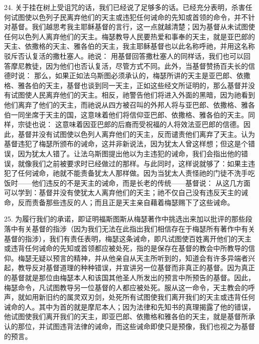 24. 关于挂在树上受诅咒的话，我们已经说了足够多的话。已经充分表明，杀害任何试图使以色列子民离弃他们的天主或违犯任何诫命的先知或首领的命令，并不针对基督。我们越思考我主耶稣基督的言行，这一点就越清楚；因为基督从未试图使任何以色列人离弃他们的天主。梅瑟教导人民要热爱和事奉的天主，就是亚巴郎的天主、依撒格的天主、雅各伯的天主，我主耶稣基督也以此名称呼祂，并用这名称驳斥否认复活的撒杜塞人。祂说： 用基督回答撒杜塞人的同样话，我们也可以回答摩尼教徒，因为他们也否认复活，尽管方式不同。此外，当基督赞扬百夫长的信德时说：  那么，如果正如法乌斯图必须承认的，梅瑟所讲的天主是亚巴郎、依撒格、雅各伯的天主，基督也谈到同一天主，正如这些经文所证明的，那么基督并没有试图使人民离弃他们的天主。相反，祂警告他们将进入外面的黑暗，因为祂看到他们离弃了他们的天主，而祂说从四方被召叫的外邦人将与亚巴郎、依撒格、雅各伯一同坐席于天主的国，这意味着他们将信仰亚巴郎、依撒格、雅各伯的天主。同样，宗徒也说：  这意味着因亚巴郎的后裔而受祝福的人将效法亚巴郎的信德。因此，基督并没有试图使以色列人离弃他们的天主，反而谴责他们离弃了天主。认为基督违犯了梅瑟所颁布的诫命，这并非新说法，因为犹太人曾这样想；但这是个错误，因为犹太人错了。让法乌斯图提出他以为主违犯的诫命，我们会指出他的错误，就像我们之前被要求时已经做过的那样。与此同时，这样说就够了：如果主违犯了任何诫命，祂就不能责备犹太人那样做。因为当犹太人责怪祂的门徒不洗手吃饭时——他们违反的不是天主的诫命，而是长老的传统——基督说：  从这几方面可以学到：基督并没有使犹太人离弃他们的天主；祂不仅自己没有违反天主的诫命，反而责备那些违反的人；而且正是天主亲自藉着梅瑟赐下了这些诫命。\par

25. 为履行我们的承诺，即证明福斯图斯从梅瑟著作中挑选出来加以批评的那些段落中有关基督的指涉（因为我们无法在此指出我们相信存在于梅瑟所有著作中有关基督的指涉），我们有责任表明，梅瑟这条诫命，即凡试图使百姓离开他们的天主或违背任何诫命的先知或首领都应被处死，指的是保存在基督的教会中所教导的信仰。梅瑟无疑以预言的精神，并从他亲自从天主所听到的，知道会有许多异端者兴起，教导反对基督道理的种种错误，并宣讲另一位基督而非真正的基督。因为真正的基督就是那位由梅瑟本人和该国其他圣人所发出的预言中所预告的基督。因此，梅瑟命令，凡试图教导另一位基督的人都应被处死。服从这一命令，天主教会的呼声，就如用新旧约的属灵双刃剑，处死所有试图使我们离开我们的天主或违背任何诫命的人。其中为首的就是摩尼本人；因为法律和先知书的真理揭露了他的错误，他试图使我们离开我们的天主，即亚巴郎、依撒格和雅各伯的天主，就是基督所承认的那位，并试图违背法律的诫命，而这些诫命即使只是预像，我们也视之为基督的预言。\par

